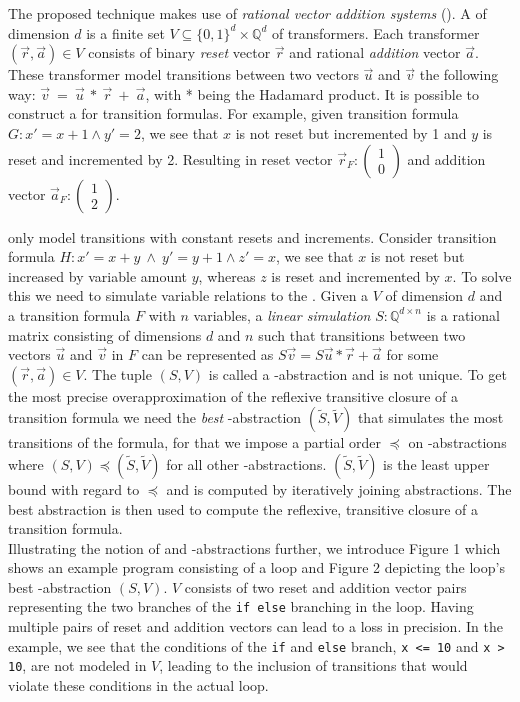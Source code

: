 The proposed technique makes use of \textsl{rational vector addition systems} (\qvasr). A \qvasr of dimension $d$ is a finite set $V \subseteq \{0, 1\}^d \times \mathbb{Q}^d$ of transformers. Each transformer $(\vec{r}, \vec{a}) \in V$ consists of binary \textsl{reset} vector $\vec{r}$ and rational \textsl{addition} vector $\vec{a}$. These transformer model transitions between two vectors $\vec{u}$ and $\vec{v}$ the following way: $\vec{v}\ =\ \vec{u}\ *\ \vec{r}\ +\ \vec{a}$, with * being the Hadamard product. It is possible to construct a \qvasr for transition formulas. For example, given transition formula $G: x' = x + 1 \land y' = 2$, we see that $x$ is not reset but incremented by 1 and $y$ is reset and incremented by 2. Resulting in reset vector $\vec{r}_F: \begin{pmatrix} 1 \\ 0\end{pmatrix}$ and addition vector $\vec{a}_F: \begin{pmatrix} 1 \\ 2\end{pmatrix}$. \par
\qvasr only model transitions with constant resets and increments. Consider transition formula $H: x' = x + y\ \land\ y' = y + 1 \land z' = x$, we see that $x$ is not reset but increased by variable amount $y$, whereas $z$ is reset and incremented by $x$. To solve this we need to simulate variable relations to the \qvasr. Given a \qvasr $V$ of dimension $d$ and a transition formula $F$ with $n$ variables, a \textsl{linear simulation} $S: \mathbb{Q}^{d \times n} $ is a rational matrix consisting of dimensions $d$ and $n$ such that transitions between two vectors $\vec{u}$ and $\vec{v}$ in $F$ can be represented as $S\vec{v} = S\vec{u} * \vec{r} + \vec{a}$ for some $(\vec{r}, \vec{a}) \in V$. The tuple $(S, V)$ is called a \qvasr-abstraction and is not unique. To get the most precise overapproximation of the reflexive transitive closure of a transition formula we need the \textsl{best} \qvasr-abstraction $(\tilde{S}, \tilde{V})$ that simulates the most transitions of the formula, for that we impose a partial order $\preceq$ on \qvasr-abstractions where $(S, V) \preceq (\tilde{S}, \tilde{V})$ for all other \qvasr-abstractions. $(\tilde{S}, \tilde{V})$ is the least upper bound with regard to $\preceq$ and is computed by iteratively joining abstractions. The best abstraction is then used to compute the reflexive, transitive closure of a transition formula. \\ Illustrating the notion of \qvasr and \qvasr-abstractions further, we introduce Figure 1 which shows an example program consisting of a loop and Figure 2 depicting the loop's best \qvasr-abstraction $(S,V)$. $V$ consists of two reset and addition vector pairs representing the two branches of the \texttt{if else} branching in the loop. Having multiple pairs of reset and addition vectors can lead to a loss in precision. In the example, we see that the conditions of the \texttt{if} and \texttt{else} branch, \texttt{x <= 10} and \texttt{x > 10}, are not modeled in $V$, leading to the inclusion of transitions that would violate these conditions in the actual loop. \\
